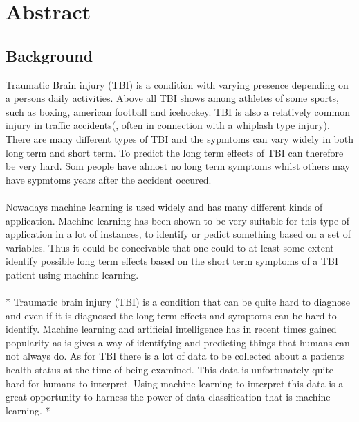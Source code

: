 \documentclass[11pt]{article}
\begin{document}
\section*{Abstract}

\subsection*{Background}

Traumatic Brain injury (TBI) is a condition with varying presence depending on a persons daily activities. Above all TBI shows among athletes of some sports, such as boxing, american football and icehockey. TBI is also a relatively common injury in traffic accidents(, often in connection with a whiplash type injury). There are many different types of TBI and the sypmtoms can vary widely in both long term and short term. To predict the long term effects of TBI can therefore be very hard. Som people have almost no long term symptoms whilst others may have sypmtoms years after the accident occured.\\
\\
Nowadays machine learning is used widely and has many different kinds of application. Machine learning has been shown to be very suitable for this type of application in a lot of instances, to identify or pedict something based on a set of variables. Thus it could be conceivable that one could to at least some extent identify possible long term effects based on the short term symptoms of a TBI patient using machine learning.\\
\\
*
Traumatic brain injury (TBI) is a condition that can be quite hard to diagnose and even if it is diagnosed the long term effects and symptoms can be hard to identify. Machine learning and artificial intelligence has in recent times gained popularity as is gives a way of identifying and predicting things that humans can not always do. As for TBI there is a lot of data to be collected about a patients health status at the time of being examined. This data is unfortunately quite hard for humans to interpret. Using machine learning to interpret this data is a great opportunity to harness the power of data classification that is machine learning.
*
\end{document}
